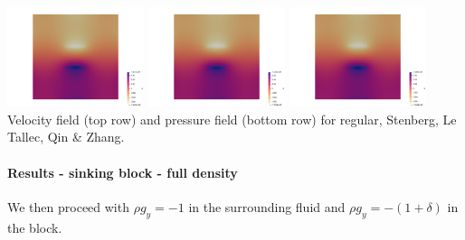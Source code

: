 \begin{center}
\includegraphics[width=4cm]{python_codes/fieldstone_78/results/sinking_block/reduced/p1}
\includegraphics[width=4cm]{python_codes/fieldstone_78/results/sinking_block/reduced/p2}
\includegraphics[width=4cm]{python_codes/fieldstone_78/results/sinking_block/reduced/p3}\\
{\captionfont Velocity field (top row) and pressure field (bottom row) 
for regular, Stenberg, Le Tallec, Qin \& Zhang.} 
\end{center}


\paragraph{Results - sinking block - full density}

We then proceed with $\rho g_y=-1$ in the surrounding fluid and $\rho g_y=-(1+\delta)$ in the block.



